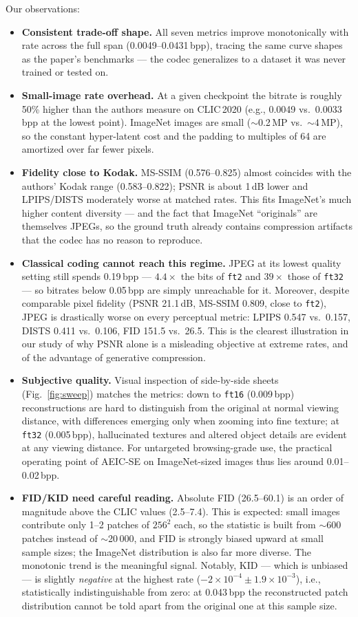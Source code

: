 \documentclass[conference]{IEEEtran}
\begin{document}
Our observations:
\begin{itemize}
\item \textbf{Consistent trade-off shape.} All seven metrics improve monotonically with rate
across the full span (0.0049--0.0431\,bpp), tracing the same curve shapes as the paper's
benchmarks --- the codec generalizes to a dataset it was never trained or tested on.
\item \textbf{Small-image rate overhead.} At a given checkpoint the bitrate is roughly 50\%
higher than the authors measure on CLIC\,2020 (e.g., 0.0049 vs.\ 0.0033\,bpp at the lowest
point). ImageNet images are small ($\sim$0.2\,MP vs.\ $\sim$4\,MP), so the constant hyper-latent
cost and the padding to multiples of 64 are amortized over far fewer pixels.
\item \textbf{Fidelity close to Kodak.} MS-SSIM (0.576--0.825) almost coincides with the
authors' Kodak range (0.583--0.822); PSNR is about 1\,dB lower and LPIPS/DISTS moderately worse
at matched rates. This fits ImageNet's much higher content diversity --- and the fact that
ImageNet ``originals'' are themselves JPEGs, so the ground truth already contains compression
artifacts that the codec has no reason to reproduce.
\item \textbf{Classical coding cannot reach this regime.} JPEG at its lowest quality setting
still spends 0.19\,bpp --- $4.4\times$ the bits of \texttt{ft2} and $39\times$ those of
\texttt{ft32} --- so bitrates below 0.05\,bpp are simply unreachable for it. Moreover, despite
comparable pixel fidelity (PSNR 21.1\,dB, MS-SSIM 0.809, close to \texttt{ft2}), JPEG is
drastically worse on every perceptual metric: LPIPS 0.547 vs.\ 0.157, DISTS 0.411 vs.\ 0.106,
FID 151.5 vs.\ 26.5. This is the clearest illustration in our study of why PSNR alone is a
misleading objective at extreme rates, and of the advantage of generative compression.
\item \textbf{Subjective quality.} Visual inspection of side-by-side sheets
(Fig.~\ref{fig:sweep}) matches the metrics: down to \texttt{ft16} (0.009\,bpp) reconstructions
are hard to distinguish from the original at normal viewing distance, with differences emerging
only when zooming into fine texture; at \texttt{ft32} (0.005\,bpp), hallucinated textures and
altered object details are evident at any viewing distance. For untargeted browsing-grade use,
the practical operating point of AEIC-SE on ImageNet-sized images thus lies around
0.01--0.02\,bpp.
\item \textbf{FID/KID need careful reading.} Absolute FID (26.5--60.1) is an order of magnitude
above the CLIC values (2.5--7.4). This is expected: small images contribute only 1--2 patches of
$256^2$ each, so the statistic is built from $\sim$600 patches instead of $\sim$20\,000, and FID
is strongly biased upward at small sample sizes; the ImageNet distribution is also far more
diverse. The monotonic trend is the meaningful signal. Notably, KID --- which is unbiased --- is
slightly \emph{negative} at the highest rate ($-2\times10^{-4} \pm 1.9\times10^{-3}$), i.e.,
statistically indistinguishable from zero: at 0.043\,bpp the reconstructed patch distribution
cannot be told apart from the original one at this sample size.
\end{itemize}
\end{document}
